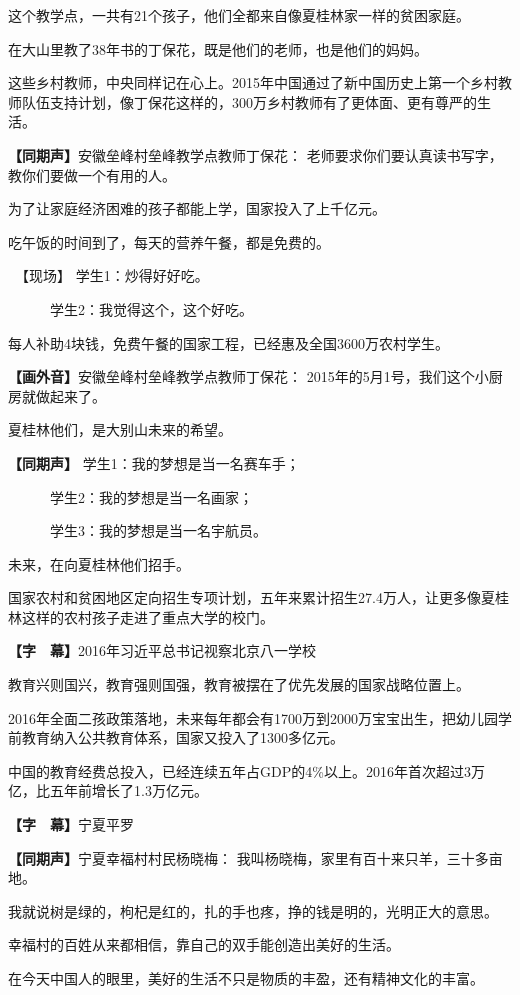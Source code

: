 \documentclass{ctexart}
\newcommand{\zkh}[1]{\textbf{\hspace{-2.7em} 【#1】}}
\begin{document}
 这个教学点，一共有21个孩子，他们全都来自像夏桂林家一样的贫困家庭。

 在大山里教了38年书的丁保花，既是他们的老师，也是他们的妈妈。

这些乡村教师，中央同样记在心上。2015年中国通过了新中国历史上第一个乡村教师队伍支持计划，像丁保花这样的，300万乡村教师有了更体面、更有尊严的生活。

 \zkh{同期声}安徽垒峰村垒峰教学点教师丁保花： 老师要求你们要认真读书写字，教你们要做一个有用的人。

 为了让家庭经济困难的孩子都能上学，国家投入了上千亿元。

 吃午饭的时间到了，每天的营养午餐，都是免费的。

 　【现场】 学生1：炒得好好吃。

 　　　学生2：我觉得这个，这个好吃。

 每人补助4块钱，免费午餐的国家工程，已经惠及全国3600万农村学生。

 \zkh{画外音}安徽垒峰村垒峰教学点教师丁保花： 2015年的5月1号，我们这个小厨房就做起来了。

 夏桂林他们，是大别山未来的希望。

 \zkh{同期声} 学生1：我的梦想是当一名赛车手；

 　　　学生2：我的梦想是当一名画家；

 　　　学生3：我的梦想是当一名宇航员。

 未来，在向夏桂林他们招手。

国家农村和贫困地区定向招生专项计划，五年来累计招生27.4万人，让更多像夏桂林这样的农村孩子走进了重点大学的校门。

 \zkh{字　幕}2016年习近平总书记视察北京八一学校

 教育兴则国兴，教育强则国强，教育被摆在了优先发展的国家战略位置上。

2016年全面二孩政策落地，未来每年都会有1700万到2000万宝宝出生，把幼儿园学前教育纳入公共教育体系，国家又投入了1300多亿元。

中国的教育经费总投入，已经连续五年占GDP的4{\%}以上。2016年首次超过3万亿，比五年前增长了1.3万亿元。

 \zkh{字　幕}宁夏平罗

 \zkh{同期声}宁夏幸福村村民杨晓梅： 我叫杨晓梅，家里有百十来只羊，三十多亩地。

 我就说树是绿的，枸杞是红的，扎的手也疼，挣的钱是明的，光明正大的意思。

 幸福村的百姓从来都相信，靠自己的双手能创造出美好的生活。

 在今天中国人的眼里，美好的生活不只是物质的丰盈，还有精神文化的丰富。
\end{document}
